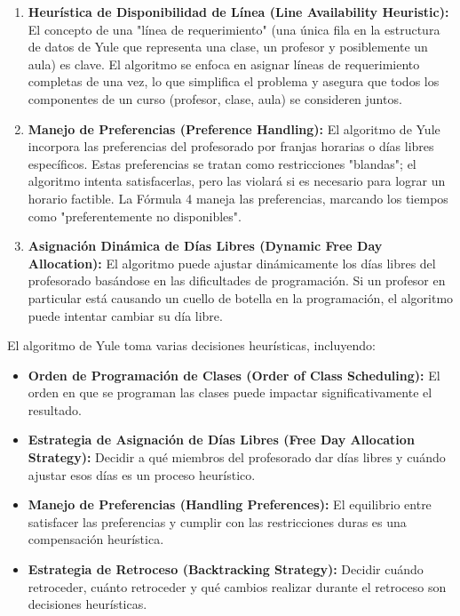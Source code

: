\begin{enumerate}[label=\alph*.]
    \item \textbf{Heurística de Disponibilidad de Línea (Line Availability Heuristic):} El concepto de una "línea de requerimiento" (una única fila en la estructura de datos de Yule que representa una clase, un profesor y posiblemente un aula) es clave.
	El algoritmo se enfoca en asignar líneas de requerimiento completas de una vez, lo que simplifica el problema y asegura que todos los componentes de un curso (profesor, clase, aula) se consideren juntos.

    \item \textbf{Manejo de Preferencias (Preference Handling):} El algoritmo de Yule incorpora las preferencias del profesorado por franjas horarias o días libres específicos.
	Estas preferencias se tratan como restricciones "blandas"; el algoritmo intenta satisfacerlas, pero las violará si es necesario para lograr un horario factible.
	La Fórmula 4 maneja las preferencias, marcando los tiempos como "preferentemente no disponibles".

    \item \textbf{Asignación Dinámica de Días Libres (Dynamic Free Day Allocation):} El algoritmo puede ajustar dinámicamente los días libres del profesorado basándose en las dificultades de programación.
	Si un profesor en particular está causando un cuello de botella en la programación, el algoritmo puede intentar cambiar su día libre.
\end{enumerate}

El algoritmo de Yule toma varias decisiones heurísticas, incluyendo:

\begin{itemize}
    \item \textbf{Orden de Programación de Clases (Order of Class Scheduling):} El orden en que se programan las clases puede impactar significativamente el resultado.
    \item \textbf{Estrategia de Asignación de Días Libres (Free Day Allocation Strategy):} Decidir a qué miembros del profesorado dar días libres y cuándo ajustar esos días es un proceso heurístico.
    \item \textbf{Manejo de Preferencias (Handling Preferences):} El equilibrio entre satisfacer las preferencias y cumplir con las restricciones duras es una compensación heurística.
    \item \textbf{Estrategia de Retroceso (Backtracking Strategy):} Decidir cuándo retroceder, cuánto retroceder y qué cambios realizar durante el retroceso son decisiones heurísticas.
\end{itemize}

